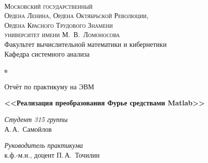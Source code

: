 \documentclass{article}
\begin{document}
\thispagestyle{empty}

\begin{center}
\ \vspace{-3cm}

{\scshape Московский государственный\\
Ордена Ленина, Ордена Октябрьской Революции,\\
Ордена Красного Трудового Знамени\\
университет имени М.~В.~Ломоносова}\\
Факультет вычислительной математики и кибернетики\\
Кафедра системного анализа

\vspace{1cm}
\includegraphics[width=6, height=6]{mgu}
\vspace{1cm}

{\LARGE Отчёт по практикуму на ЭВМ}

\vspace{1cm}

{\Huge\bfseries <<Реализация преобразования Фурье средствами Matlab>>}
\end{center}

\vspace{1cm}

\begin{flushright}
  \large
  \textit{Студент 315 группы}\\
  А.\,А.~Самойлов

  \vspace{5mm}

  \textit{Руководитель практикума}\\
  к.ф.-м.н., доцент П.\,А.~Точилин
\end{flushright}
\end{document}
